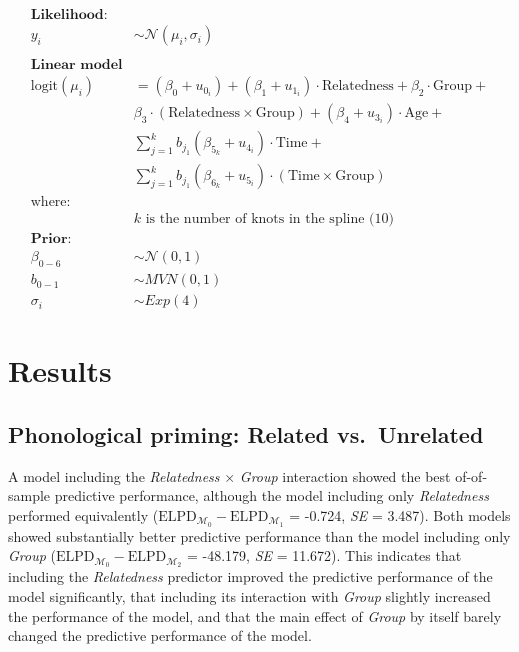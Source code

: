 \documentclass[
  letterpaper,
  DIV=11,
  numbers=noendperiod]{scrartcl}
\begin{document}
\[
\begin{aligned}
\textbf{Likelihood:} \\
y_i &\sim \mathcal{N}(\mu_i, \sigma_i) \\ \\
\textbf{Linear model} \\
\text{logit}(\mu_i) &= (\beta_0 + u _{0_{i}}) + (\beta_1 + u _{1_{i}}) \cdot \text{Relatedness} + \beta_{2} \cdot \text{Group} + \\
&\beta_{3} \cdot (\text{Relatedness} \times \text{Group}) + (\beta_4 + u_{3_{i}}) \cdot \text{Age} + \\
&\sum_{j = 1}^k b_{j_{1}}(\beta_{5_{k}} + u_{4_{i}}) \cdot \text{Time} + \\
&\sum_{j = 1}^k b_{j_{1}} (\beta_{6_{k }} + u_{5_{i}}) \cdot (\text{Time} \times \text{Group}) \\
\text{where:} \\
&k \text{ is the number of knots in the spline (10)} \\
\textbf{Prior:} \\
\beta_{0-6} &\sim \mathcal{N}(0, 1) \\
b_{0-1} &\sim MVN(0, 1) \\
\sigma_i &\sim Exp(4) 
\end{aligned}
\]

\hypertarget{results}{%
\section{Results}\label{results}}

\hypertarget{phonological-priming-related-vs.-unrelated}{%
\subsection{Phonological priming: Related
vs.~Unrelated}\label{phonological-priming-related-vs.-unrelated}}

A model including the \emph{Relatedness} \(\times\) \emph{Group}
interaction showed the best of-of-sample predictive performance,
although the model including only \emph{Relatedness} performed
equivalently
(\(\text{ELPD}_{\mathcal{M_0}} - \text{ELPD}_{\mathcal{M_1}}\) = -0.724,
\emph{SE} = 3.487). Both models showed substantially better predictive
performance than the model including only \emph{Group}
(\(\text{ELPD}_{\mathcal{M_0}} - \text{ELPD}_{\mathcal{M_2}}\) =
-48.179, \emph{SE} = 11.672). This indicates that including the
\emph{Relatedness} predictor improved the predictive performance of the
model significantly, that including its interaction with \emph{Group}
slightly increased the performance of the model, and that the main
effect of \emph{Group} by itself barely changed the predictive
performance of the model.
\end{document}
